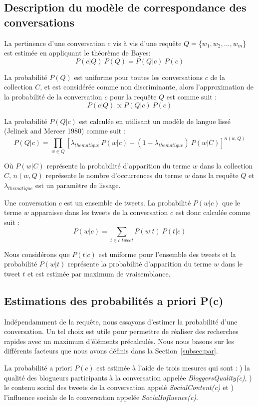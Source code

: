 \documentclass{article-hermes}
\begin{document}
\subsection{Description du modèle de correspondance des conversations}
La pertinence d'une conversation $c$ vis à vis d'une requête $Q=$\{$w_{1},w_{2}, ..., w_{m}$\} est estimée en appliquant le théorème de Bayes: 
\begin{equation}
P(c|Q)~P(Q) = P(Q|c)~P(c)
\end{equation}
\par La probabilité $P(Q)$ est uniforme pour toutes les conversations $c$ de la collection $C$, et est considérée comme non discriminante, alors l'approximation de la probabilité de la conversation $c$ pour la requête $Q$ est comme suit : 
\begin{equation}
P(c|Q) \propto P(Q|c)~P(c)
\label{modele}
\end{equation}
\par La probabilité $P(Q|c)$ est calculée en utilisant un modèle de langue lissé
(Jelinek and Mercer 1980) comme suit : 
\begin{equation}
P(Q|c) = \prod_{w\in Q}[ \lambda_{thematique} ~ P(w|c) + (1-\lambda_{thematique}) ~P(w|C)]^{n(w,Q)}
\end{equation}
\par Où $P(w|C)$ représente la probabilité d'apparition du terme $w$ dans la collection $C$, $n(w,Q)$ représente le nombre d'occurrences du terme $w$ dans la requête $Q$ et $\lambda_{thematique}$ est un paramètre de lissage.
\par Une conversation $c$ est un ensemble de tweets. La probabilité $P(w|c)$ que le terme $w$ apparaisse dans les tweets de la conversation $c$ est donc calculée comme suit : 
\begin{equation}
P(w|c) = \sum_{t \in c.tweet} P(w|t)~P(t|c)
\end{equation}
\par Nous considérons que $P(t|c)$ est uniforme pour l'ensemble des tweets et la probabilité $P(w|t)$ représente la probabilité d'apparition du terme $w$ dans le tweet $t$ et est estimée par maximum de vraisemblance.


\subsection{Estimations des probabilités a priori P(c)} 
\par Indépendamment de la requête, nous essayons d'estimer la probabilité d'une conversation. Un tel choix est utile pour permettre de réaliser des recherches rapides avec un maximum d'éléments précalculés. Nous nous basons sur les différents facteurs que nous avons définis dans la Section~\ref{subsec:par}.
\par La probabilité a priori $P(c)$ est estimée à l'aide de trois mesures qui sont : ) la qualité des blogueurs participants à la conversation appelée \textit{BloggersQuality(c)}, ) le contenu social des tweets de la conversation appelé \textit{SocialContent(c)} et  ) l'influence sociale de la conversation appelée \textit{SocialInfluence(c)}.
\end{document}
